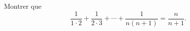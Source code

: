 

\begin{exercice}\label{exoSerieUn0017}

	Montrer que 
	\begin{equation}
		\frac{1}{ 1\cdot 2 }+\frac{1}{ 2\cdot 3 }+\cdots+\frac{1}{ n(n+1) }=\frac{ n }{ n+1 }.
	\end{equation}
	

\end{exercice}
